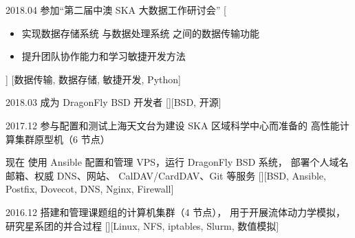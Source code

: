 \documentclass[zh]{resume}
\begin{document}
\begin{experiences}
  \experience
    {2018.04}%
    {参加\enquote{第二届中澳 SKA 大数据工作研讨会}}%
    [\begin{itemize}
      \item 实现数据存储系统
            与数据处理系统
            之间的数据传输功能
      \item 提升团队协作能力和学习敏捷开发方法
    \end{itemize}]%
    [数据传输, 数据存储, 敏捷开发, Python]

  \separator{0.5em}
  \experience
    {2018.03}%
    {成为 DragonFly BSD 开发者}%
    [][BSD, 开源]


  \separator{0.5em}
  \experience
    {2017.12}%
    {参与配置和测试上海天文台为建设 SKA 区域科学中心而准备的
      高性能计算集群原型机（6 节点）}



  \separator{0.5em}
  \experience
    {现在 }%
    {使用 Ansible 配置和管理 VPS，运行 DragonFly BSD 系统，
      部署个人域名邮箱、权威 DNS、网站、 CalDAV/CardDAV、Git 等服务}%
    [][BSD, Ansible, Postfix, Dovecot, DNS, Nginx, Firewall]

  \separator{0.5em}
  \experience
    {2016.12}%
    {搭建和管理课题组的计算机集群（4 节点），
      用于开展流体动力学模拟，研究星系团的并合过程}%
    [][Linux, NFS, iptables, Slurm, 数值模拟]


\end{experiences}
\end{document}
